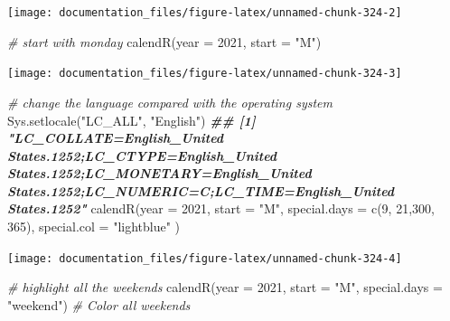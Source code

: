 \documentclass[
]{article}
\newenvironment{Shaded}{\begin{snugshade}}{\end{snugshade}}
\newcommand{\AttributeTok}[1]{\textcolor[rgb]{0.77,0.63,0.00}{#1}}
\newcommand{\CommentTok}[1]{\textcolor[rgb]{0.56,0.35,0.01}{\textit{#1}}}
\newcommand{\DecValTok}[1]{\textcolor[rgb]{0.00,0.00,0.81}{#1}}
\newcommand{\DocumentationTok}[1]{\textcolor[rgb]{0.56,0.35,0.01}{\textbf{\textit{#1}}}}
\newcommand{\FunctionTok}[1]{\textcolor[rgb]{0.00,0.00,0.00}{#1}}
\newcommand{\NormalTok}[1]{#1}
\newcommand{\StringTok}[1]{\textcolor[rgb]{0.31,0.60,0.02}{#1}}
\begin{document}
\begin{center}\texttt{[image: documentation\_files/figure-latex/unnamed-chunk-324-2]} \end{center}

\begin{Shaded}
\begin{Highlighting}[]

\CommentTok{\# start with monday}
\FunctionTok{calendR}\NormalTok{(}\AttributeTok{year =} \DecValTok{2021}\NormalTok{, }
        \AttributeTok{start =} \StringTok{"M"}\NormalTok{)}
\end{Highlighting}
\end{Shaded}

\begin{center}\texttt{[image: documentation\_files/figure-latex/unnamed-chunk-324-3]} \end{center}

\begin{Shaded}
\begin{Highlighting}[]

\CommentTok{\# change the language compared with the operating system }
\FunctionTok{Sys.setlocale}\NormalTok{(}\StringTok{"LC\_ALL"}\NormalTok{, }\StringTok{"English"}\NormalTok{)}
\DocumentationTok{\#\# [1] "LC\_COLLATE=English\_United States.1252;LC\_CTYPE=English\_United States.1252;LC\_MONETARY=English\_United States.1252;LC\_NUMERIC=C;LC\_TIME=English\_United States.1252"}
\FunctionTok{calendR}\NormalTok{(}\AttributeTok{year =} \DecValTok{2021}\NormalTok{, }
        \AttributeTok{start =} \StringTok{"M"}\NormalTok{, }
        \AttributeTok{special.days =} \FunctionTok{c}\NormalTok{(}\DecValTok{9}\NormalTok{, }\DecValTok{21}\NormalTok{,}\DecValTok{300}\NormalTok{, }\DecValTok{365}\NormalTok{),}
        \AttributeTok{special.col =} \StringTok{"lightblue"}
\NormalTok{        )}
\end{Highlighting}
\end{Shaded}

\begin{center}\texttt{[image: documentation\_files/figure-latex/unnamed-chunk-324-4]} \end{center}

\begin{Shaded}
\begin{Highlighting}[]

\CommentTok{\# highlight all the weekends}
\FunctionTok{calendR}\NormalTok{(}\AttributeTok{year =} \DecValTok{2021}\NormalTok{,}
        \AttributeTok{start =} \StringTok{"M"}\NormalTok{,}
        \AttributeTok{special.days =} \StringTok{"weekend"}\NormalTok{) }\CommentTok{\# Color all weekends}
\end{Highlighting}
\end{Shaded}
\end{document}
